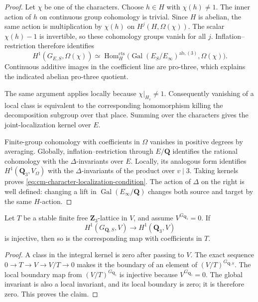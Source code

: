 \begin{proof}
Let \(\chi\) be one of the characters. Choose \(h\in H\)
with \(\chi(h)\ne1\). The inner action of \(h\) on continuous
group cohomology is trivial. Since \(H\) is abelian, the same
action is multiplication by \(\chi(h)\) on
\(H^j(H,\Omega(\chi))\). The scalar \(\chi(h)-1\) is invertible,
so these cohomology groups vanish for all \(j\).
Inflation--restriction therefore identifies
\[
 H^1(G_{E,S},\Omega(\chi))
 \simeq
 \operatorname{Hom}^{\mathrm{cts}}_H
 \bigl(\operatorname{Gal}(E_S/E_\infty)^{\mathrm{ab},(3)},
       \Omega(\chi)\bigr).
\]
Continuous additive images in the coefficient line are pro-three,
which explains the indicated abelian pro-three quotient.

The same argument applies locally because
\(\chi|_{H_v}\ne1\). Consequently vanishing of a local class
is equivalent to the corresponding homomorphism killing the
decomposition subgroup over that place. Summing over the
characters gives the joint-localization kernel over \(E\).

Finite-group cohomology with coefficients in \(\Omega\) vanishes
in positive degrees by averaging. Globally, inflation--restriction
through \(E/\mathbf Q\) identifies the rational cohomology
with the \(\Delta\)-invariants over \(E\). Locally, its analogous
form identifies \(H^1(\mathbf Q_3,V_\Omega)\) with the
\(\Delta\)-invariants of the product over \(v\mid3\).
Taking kernels proves \eqref{eq:cm-character-localization-condition}.
The action of \(\Delta\) on the right is well defined: changing
a lift in \(\operatorname{Gal}(E_\infty/\mathbf Q)\) changes
both source and target by the same \(H\)-action.
\end{proof}

\begin{lemma}
\label{lem:localization-integral-recovery}
Let \(T\) be a stable finite free \(\mathbf Z_3\)-lattice in \(V\),
and assume \(V^{G_{\mathbf Q_3}}=0\).
If
\[
 H^1(G_{\mathbf Q,S},V)\longrightarrow H^1(\mathbf Q_3,V)
\]
is injective, then so is the corresponding map with coefficients
in \(T\).
\end{lemma}
\begin{proof}
A class in the integral kernel is zero after passing to \(V\).
The exact sequence \(0\to T\to V\to V/T\to0\) makes it the
boundary of an element of \((V/T)^{G_{\mathbf Q,S}}\).
The local boundary map from \((V/T)^{G_{\mathbf Q_3}}\) is
injective because \(V^{G_{\mathbf Q_3}}=0\).
The global invariant is also a local invariant, and its local
boundary is zero; it is therefore zero. This proves the claim.
\end{proof}

